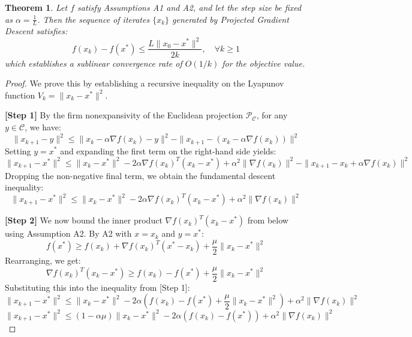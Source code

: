 \documentclass[11pt]{article}
\newtheorem{theorem}{Theorem}
\begin{document}
\begin{theorem}
Let $f$ satisfy Assumptions A1 and A2, and let the step size be fixed as $\alpha = \frac{1}{L}$. Then the sequence of iterates $\{x_k\}$ generated by Projected Gradient Descent satisfies:
\[ f(x_k) - f(x^*) \leq \frac{L \|x_0 - x^*\|^2}{2k}, \quad \forall k \geq 1 \]
which establishes a sublinear convergence rate of $O(1/k)$ for the objective value.
\end{theorem}

\begin{proof}
We prove this by establishing a recursive inequality on the Lyapunov function $V_k = \|x_k - x^*\|^2$.

\textbf{[Step 1]} By the firm nonexpansivity of the Euclidean projection $\mathcal{P}_{\mathcal{C}}$, for any $y \in \mathcal{C}$, we have:
\[ \|x_{k+1} - y\|^2 \leq \|x_k - \alpha \nabla f(x_k) - y\|^2 - \|x_{k+1} - (x_k - \alpha \nabla f(x_k))\|^2 \]
Setting $y = x^*$ and expanding the first term on the right-hand side yields:
\[ \|x_{k+1} - x^*\|^2 \leq \|x_k - x^*\|^2 - 2\alpha \nabla f(x_k)^T (x_k - x^*) + \alpha^2 \|\nabla f(x_k)\|^2 - \|x_{k+1} - x_k + \alpha \nabla f(x_k)\|^2 \]
Dropping the non-negative final term, we obtain the fundamental descent inequality:
\[ \|x_{k+1} - x^*\|^2 \leq \|x_k - x^*\|^2 - 2\alpha \nabla f(x_k)^T (x_k - x^*) + \alpha^2 \|\nabla f(x_k)\|^2 \]

\textbf{[Step 2]} We now bound the inner product $\nabla f(x_k)^T (x_k - x^*)$ from below using Assumption A2. By A2 with $x = x_k$ and $y = x^*$:
\[ f(x^*) \geq f(x_k) + \nabla f(x_k)^T (x^* - x_k) + \frac{\mu}{2} \|x_k - x^*\|^2 \]
Rearranging, we get:
\[ \nabla f(x_k)^T (x_k - x^*) \geq f(x_k) - f(x^*) + \frac{\mu}{2} \|x_k - x^*\|^2 \]
Substituting this into the inequality from [Step 1]:
\[ \|x_{k+1} - x^*\|^2 \leq \|x_k - x^*\|^2 - 2\alpha \left( f(x_k) - f(x^*) + \frac{\mu}{2} \|x_k - x^*\|^2 \right) + \alpha^2 \|\nabla f(x_k)\|^2 \]
\[ \|x_{k+1} - x^*\|^2 \leq (1 - \alpha \mu) \|x_k - x^*\|^2 - 2\alpha (f(x_k) - f(x^*)) + \alpha^2 \|\nabla f(x_k)\|^2 \]


\end{proof}
\end{document}
